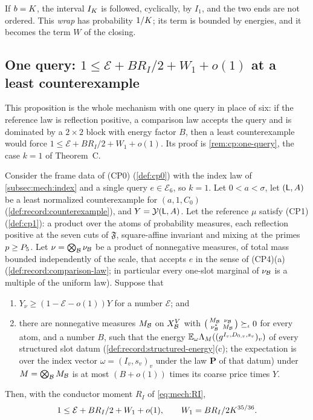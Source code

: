 If $b=K$, the interval $I_K$ is followed, cyclically, by $I_1$, and the
two ends are not ordered. This \emph{wrap} has probability $1/K$; its term
is bounded by energies, and it becomes the term $W$ of the closing.

\subsection{One query: \texorpdfstring{$1\le\mathcal E+BR_I/2+W_1+o(1)$}{1 <= E+B R\_I/2+W\_1+o(1)} at a least counterexample}\label{subsec:mech:one-query}

This proposition is the whole mechanism with one query in place of
six: if the reference law is reflection positive, a comparison law
accepts the query and is dominated by a $2\times2$ block with energy
factor $B$, then a least counterexample would force
$1\le\mathcal E+BR_I/2+W_1+o(1)$. Its proof is
\cref{rem:cp:one-query}, the case $k=1$ of Theorem~C.

\begin{proposition}\label{prop:mech:one-query}
Consider the frame data of (CP0) (\cref{def:cp0}) with the index law of
\cref{subsec:mech:index} and a single query $e\in\mathcal E_6$, so $k=1$. Let
$0<a<\sigma$, let $(\mathsf L,A)$ be a least normalized counterexample for
$(a,1,C_0)$ (\cref{def:record:counterexample}), and $Y=\mathcal Y(\mathsf L,A)$. Let the
reference $\mu$ satisfy (CP1) (\cref{def:cp1}): a product over the atoms of
probability measures, each reflection positive at the seven cuts of
$\mathfrak F$, square-affine invariant and mixing at the primes
$p\ge P_5$. Let $\nu=\bigotimes_\mathcal B\nu_\mathcal B$ be a product of nonnegative
measures, of total mass bounded independently of the scale, that accepts
$e$ in the sense of (CP4)(a) (\cref{def:record:comparison-law}; in particular
every one-slot marginal of $\nu_\mathcal B$ is a multiple of the uniform law).
Suppose that
\begin{enumerate}[label=\textup{(H\arabic*)}]
\item $Y_\nu\ge(1-\mathcal E-o(1))Y$ for a number $\mathcal E$; and
\item there are nonnegative measures $M_\mathcal B$ on $X_\mathcal B^V$ with
 $\bigl(\begin{smallmatrix}M_\mathcal B&\nu_\mathcal B\\ \nu_\mathcal B^*&M_\mathcal B\end{smallmatrix}\bigr)
 \succeq_\iota0$ for every atom, and a number $B$, such that the energy
 $\mathbb E_\omega\Lambda_M((g^{I_v,D_{0,v},s_v})_v)$ of every structured slot datum
 (\cref{def:record:structured-energy}(c); the expectation is
 over the index vector $\omega=(I_v,s_v)_v$ under the law
 $\mathbf P$ of that datum) under $M=\bigotimes_\mathcal B M_\mathcal B$ is at most
 $(B+o(1))$ times its coarse price times $Y$.
\end{enumerate}
Then, with the conductor moment $R_I$ of \eqref{eq:mech:RI},
\[
 1\le\mathcal E+BR_I/2+W_1+o(1),\qquad W_1=BR_I/2K^{35/36} .
\]
\end{proposition}

